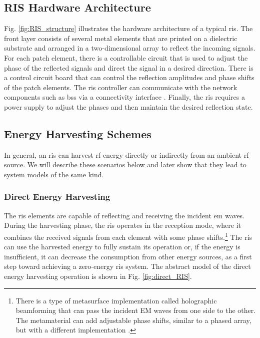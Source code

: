 \documentclass[conference]{IEEEtran}
\begin{document}
\subsection{RIS Hardware Architecture}

Fig. \ref{fig:RIS_structure} illustrates the hardware architecture of a typical \gls*{ris}. The front layer consists of several metal elements that are printed on a dielectric substrate and arranged in a two-dimensional array to reflect the incoming signals. For each patch element, there is a controllable circuit that is used to adjust the phase of the reflected signals and direct the signal in a desired direction.
 There is a control circuit board that can control the reflection amplitudes and phase shifts of the patch elements. The \gls*{ris} controller can communicate with the network components such as \glspl*{bs} via a connectivity interface \cite{9140329}.  Finally, the \gls*{ris} requires a power supply to adjust the phases and then maintain the desired reflection state.






\subsection{Energy Harvesting Schemes}
In general, an \gls*{ris} can harvest \gls*{rf} energy directly or indirectly from an ambient \gls*{rf} source. We will describe these scenarios below and later show that they lead to system models of the same kind. 

\subsubsection{Direct Energy Harvesting}
The \gls*{ris} elements are capable of reflecting and receiving the incident \gls*{em} waves. During the harvesting phase, the \gls*{ris} operates in the reception mode, where it combines the received signals from each element with some phase shifts.\footnote{There is a type of metasurface implementation called holographic beamforming that can pass the incident EM waves from one side to the other. The metamaterial can add adjustable phase shifts, similar to a phased array, but with a different implementation \cite{black2017holographic}.} The \gls*{ris} can use the harvested energy to fully sustain its operation or, if the energy is insufficient, it can decrease the consumption from other energy sources, as a first step toward achieving a zero-energy \gls*{ris} system. The abstract model of the direct energy harvesting operation is shown in Fig. \ref{fig:direct_RIS}.   
\end{document}
